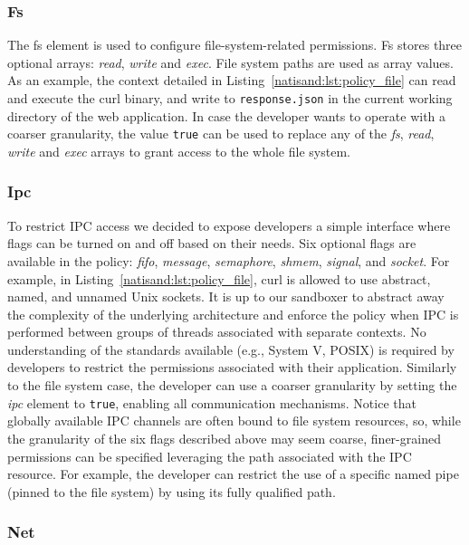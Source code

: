 \subsubsection*{Fs}

The fs element is used to configure file-system-related permissions. Fs
stores three optional arrays: {\em read}, {\em write} and {\em
  exec}. File system paths are used as array values. As an example, the
context detailed in Listing~\ref{natisand:lst:policy_file} can read and execute
the curl binary, and write to {\tt response.json} in the current
working directory of the web application. In case the developer wants
to operate with a coarser granularity, the value {\tt true} can be
used to replace any of the {\em fs}, {\em read}, {\em write} and {\em
  exec} arrays to grant access to the whole file system.

\subsubsection*{Ipc}

To restrict IPC access we decided to expose developers a simple
interface where flags can be turned on and off based on their needs.
Six optional flags are available in the policy: {\em fifo}, {\em
  message}, {\em semaphore}, {\em shmem}, {\em signal}, and {\em
  socket}. For example, in Listing~\ref{natisand:lst:policy_file}, curl is
allowed to use abstract, named, and unnamed Unix sockets. It is up to our sandboxer to abstract away the complexity
of the underlying architecture and enforce the policy when IPC is
performed between groups of threads associated with separate
contexts. No understanding of the standards available (e.g., System V,
POSIX) is required by developers to restrict the permissions
associated with their application. Similarly to the file system case, the
developer can use a coarser granularity by setting the {\em ipc}
element to {\tt true}, enabling all communication mechanisms.
Notice that globally available IPC channels are often bound to
file system resources, so, while the granularity of the six flags
described above may seem coarse, finer-grained permissions can be
specified leveraging the path associated with the IPC resource.
For example, the developer can restrict the use of a specific named
pipe (pinned to the file system) by using its fully qualified path.

\subsubsection*{Net}

